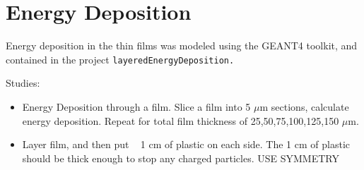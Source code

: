 \section{Energy Deposition}

Energy deposition in the thin films was modeled using the GEANT4 toolkit, and contained in the project \tt{layeredEnergyDeposition}.


Studies:
\begin{itemize}
    \item Energy Deposition through a film. Slice a film into 5 $\mu$m sections, calculate energy deposition. Repeat for total film thickness of 25,50,75,100,125,150 $\mu$m.
    \item Layer film, and then put ~ 1 cm of plastic on each side. The 1 cm of plastic should be thick enough to stop any charged particles. USE SYMMETRY
\end{itemize}

